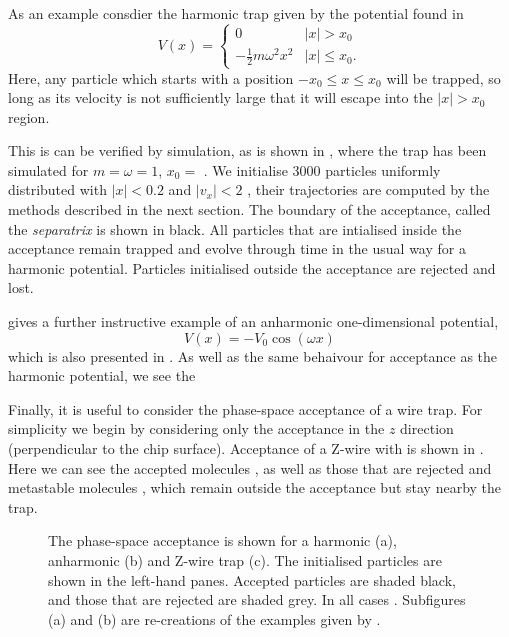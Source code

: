 As an example consdier the harmonic trap given by the potential found in
%
\begin{equation}
  V(x) = \begin{cases}
    0 & |x| > x_0 \\
    -\frac{1}{2}m\omega^2 x^2 & |x| \leq x_0.
  \end{cases}
\end{equation}
%
Here, any particle which starts with a position $-x_0 \leq x \leq x_0$ will be
trapped, so long as its velocity is not sufficiently large that it will escape
into the $|x|> x_0$ region.

This is can be verified by simulation, as is shown in
, where the trap has been simulated for $m =
\omega = 1$, $x_0 =$ . We initialise 3000 particles uniformly distributed
with $|x| < 0.2$ and $|v_x|<2$ , their trajectories are computed by
the methods described in the next section. The boundary of the acceptance,
called the \emph{separatrix} is shown in black. All particles that are
intialised inside the acceptance remain trapped and evolve through time in the
usual way for a harmonic potential. Particles initialised outside the
acceptance are rejected and lost.

 gives a further instructive example of an anharmonic
one-dimensional potential,
%
\begin{equation}
  V(x) = -V_0\cos(\omega x)
\end{equation}
%
which is also presented in . As well as the same
behaivour for acceptance as the harmonic potential, we see the

Finally, it is useful to consider the phase-space acceptance of a wire trap.
For simplicity we begin by considering only the acceptance in the $z$ direction
(perpendicular to the chip surface). Acceptance of a Z-wire with 
is shown in . Here we can see the accepted
molecules , as well as those that are rejected  and
metastable molecules , which remain outside the acceptance but stay
nearby the trap. 

\begin{figure}
  \centering
  \caption{
    The phase-space acceptance is shown for a harmonic (a), anharmonic (b) and
    Z-wire trap (c). The initialised particles are shown in the left-hand
    panes. Accepted particles are shaded black, and those that are rejected are
    shaded grey. In all cases . Subfigures (a) and (b)
    are re-creations of the examples given by .
  }
  \label{design:fig:psaeg}
\end{figure}

